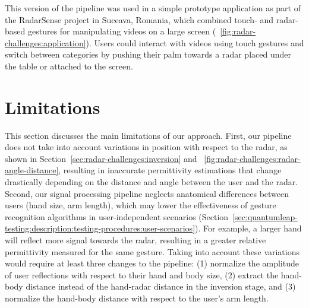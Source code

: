 This version of the pipeline was used in a simple prototype application as part of the RadarSense project in Suceava, Romania, which combined touch- and radar-based gestures for manipulating videos on a large screen (\fig~\ref{fig:radar-challenges:application}). Users could interact with videos using touch gestures and switch between categories by pushing their palm towards a radar placed under the table or attached to the screen.

\section{Limitations} \label{sec:radar-challenges:limitations}
This section discusses the main limitations of our approach.
%
First, our pipeline does not take into account variations in position with respect to the radar, as shown in Section~\ref{sec:radar-challenges:inversion} and \fig~\ref{fig:radar-challenges:radar-angle-distance}, resulting in inaccurate permittivity estimations that change drastically depending on the distance and angle between the user and the radar.
%
Second, our signal processing pipeline neglects anatomical differences between users (\eg hand size, arm length), which may lower the effectiveness of gesture recognition algorithms in user-independent scenarios (Section~\ref{sec:quantumleap-testing:description:testing-procedures:user-scenarios}). For example, a larger hand will reflect more signal towards the radar, resulting in a greater relative permittivity measured for the same gesture. Taking into account these variations would require at least three changes to the pipeline: (1) normalize the amplitude of user reflections with respect to their hand and body size, (2) extract the hand-body distance instead of the hand-radar distance in the inversion stage, and (3) normalize the hand-body distance with respect to the user's arm length.




